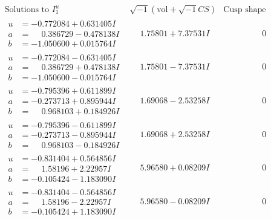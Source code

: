 \documentclass[1p]{elsarticle_modified}
\theoremstyle{definition}
\newcommand{\I}{\sqrt{-1}}
\begin{document}
$$\begin{array}{c|c|c}  
\text{Solutions to }I^u_{1}& \I (\text{vol} + \sqrt{-1}CS) & \text{Cusp shape}\\
 \hline 
\begin{aligned}
u &= -0.772084 + 0.631405 I \\
a &= \phantom{-}0.386729 - 0.478138 I \\
b &= -1.050600 + 0.015764 I\end{aligned}
 & \phantom{-}1.75801 + 7.37531 I & \phantom{-0.000000 } 0 \\ \hline\begin{aligned}
u &= -0.772084 - 0.631405 I \\
a &= \phantom{-}0.386729 + 0.478138 I \\
b &= -1.050600 - 0.015764 I\end{aligned}
 & \phantom{-}1.75801 - 7.37531 I & \phantom{-0.000000 } 0 \\ \hline\begin{aligned}
u &= -0.795396 + 0.611899 I \\
a &= -0.273713 + 0.895944 I \\
b &= \phantom{-}0.968103 + 0.184926 I\end{aligned}
 & \phantom{-}1.69068 - 2.53258 I & \phantom{-0.000000 } 0 \\ \hline\begin{aligned}
u &= -0.795396 - 0.611899 I \\
a &= -0.273713 - 0.895944 I \\
b &= \phantom{-}0.968103 - 0.184926 I\end{aligned}
 & \phantom{-}1.69068 + 2.53258 I & \phantom{-0.000000 } 0 \\ \hline\begin{aligned}
u &= -0.831404 + 0.564856 I \\
a &= \phantom{-}1.58196 + 2.22957 I \\
b &= -0.105424 - 1.183090 I\end{aligned}
 & \phantom{-}5.96580 + 0.08209 I & \phantom{-0.000000 } 0 \\ \hline\begin{aligned}
u &= -0.831404 - 0.564856 I \\
a &= \phantom{-}1.58196 - 2.22957 I \\
b &= -0.105424 + 1.183090 I\end{aligned}
 & \phantom{-}5.96580 - 0.08209 I & \phantom{-0.000000 } 0 \\ \hline\begin{aligned}

\end{aligned}
\end{array}$$
\end{document}
